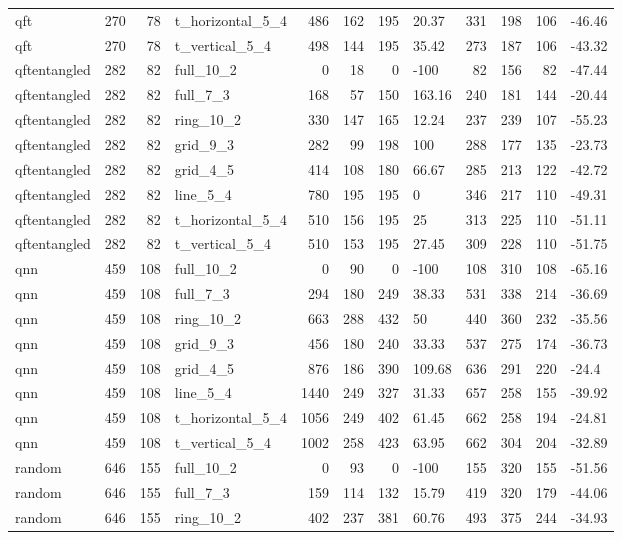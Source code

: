 \begin{longtable}{lrrlrrrlrrrl}
qft & 270 & 78 & t\_horizontal\_5\_4 & 486 & 162 & 195 & 20.37 & 331 & 198 & 106 & -46.46 \\
qft & 270 & 78 & t\_vertical\_5\_4 & 498 & 144 & 195 & 35.42 & 273 & 187 & 106 & -43.32 \\
qftentangled & 282 & 82 & full\_10\_2 & 0 & 18 & 0 & -100 & 82 & 156 & 82 & -47.44 \\
qftentangled & 282 & 82 & full\_7\_3 & 168 & 57 & 150 & 163.16 & 240 & 181 & 144 & -20.44 \\
qftentangled & 282 & 82 & ring\_10\_2 & 330 & 147 & 165 & 12.24 & 237 & 239 & 107 & -55.23 \\
qftentangled & 282 & 82 & grid\_9\_3 & 282 & 99 & 198 & 100 & 288 & 177 & 135 & -23.73 \\
qftentangled & 282 & 82 & grid\_4\_5 & 414 & 108 & 180 & 66.67 & 285 & 213 & 122 & -42.72 \\
qftentangled & 282 & 82 & line\_5\_4 & 780 & 195 & 195 & 0 & 346 & 217 & 110 & -49.31 \\
qftentangled & 282 & 82 & t\_horizontal\_5\_4 & 510 & 156 & 195 & 25 & 313 & 225 & 110 & -51.11 \\
qftentangled & 282 & 82 & t\_vertical\_5\_4 & 510 & 153 & 195 & 27.45 & 309 & 228 & 110 & -51.75 \\
qnn & 459 & 108 & full\_10\_2 & 0 & 90 & 0 & -100 & 108 & 310 & 108 & -65.16 \\
qnn & 459 & 108 & full\_7\_3 & 294 & 180 & 249 & 38.33 & 531 & 338 & 214 & -36.69 \\
qnn & 459 & 108 & ring\_10\_2 & 663 & 288 & 432 & 50 & 440 & 360 & 232 & -35.56 \\
qnn & 459 & 108 & grid\_9\_3 & 456 & 180 & 240 & 33.33 & 537 & 275 & 174 & -36.73 \\
qnn & 459 & 108 & grid\_4\_5 & 876 & 186 & 390 & 109.68 & 636 & 291 & 220 & -24.4 \\
qnn & 459 & 108 & line\_5\_4 & 1440 & 249 & 327 & 31.33 & 657 & 258 & 155 & -39.92 \\
qnn & 459 & 108 & t\_horizontal\_5\_4 & 1056 & 249 & 402 & 61.45 & 662 & 258 & 194 & -24.81 \\
qnn & 459 & 108 & t\_vertical\_5\_4 & 1002 & 258 & 423 & 63.95 & 662 & 304 & 204 & -32.89 \\
random & 646 & 155 & full\_10\_2 & 0 & 93 & 0 & -100 & 155 & 320 & 155 & -51.56 \\
random & 646 & 155 & full\_7\_3 & 159 & 114 & 132 & 15.79 & 419 & 320 & 179 & -44.06 \\
random & 646 & 155 & ring\_10\_2 & 402 & 237 & 381 & 60.76 & 493 & 375 & 244 & -34.93 \\

\end{longtable}
